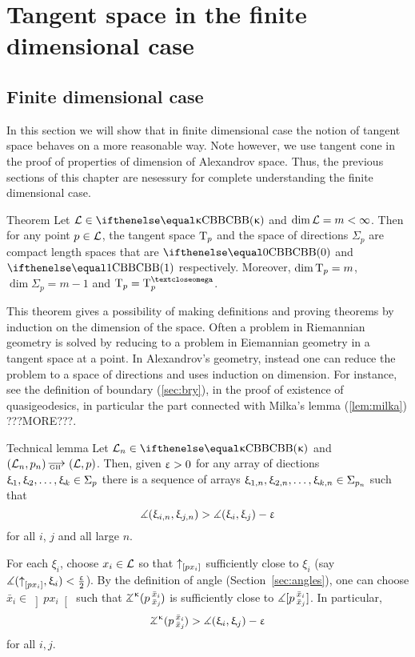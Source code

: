 
\chapter{Tangent space in the finite dimensional case}

\section{Finite dimensional case}

In this section we will show that in finite dimensional case the notion of tangent space behaves on a more reasonable way.
Note however, 
we use tangent cone in the proof of properties of dimension of Alexandrov space.
Thus, the previous sections of this chapter are nesessury for complete understanding the finite dimensional case.

\begin{thm}{Theorem}\label{thm:tan4finite} 
Let $\spc{L}\in \Alex\kappa$ and $\mathop{\rm dim}\nolimits\mathcal{L}=m<\infty$. 
Then for any point $p\in \spc{L}$, the tangent space $\text{\rm T}_p$ and the space of directions $\Sigma_p$ are compact length spaces that are  $\Alex 0$ and $\Alex1$ respectively.
Moreover, $\mathop{\rm dim}\nolimits\text{\rm T}_p=m$, $\dim\Sigma_p=m-1$ and  $\T_p=\T^\o_p$.
\end{thm}


This theorem gives a possibility of making definitions and proving theorems by induction on the dimension of the space.
Often a problem in Riemannian geometry is solved by 
reducing to a problem in Eiemannian geometry 
in a tangent space at a point.
In Alexandrov's geometry, instead one can reduce the problem 
to a space of directions and uses induction on dimension. 
For instance, see the  
definition of boundary (\ref{sec:bry}), 
in the proof of existence of quasigeodesics, in particular the part connected with Milka's lemma (\ref{lem:milka}) ???MORE???.

\begin{thm}{Technical lemma}\label{lem:tan-tech}
Let $\spc{L}_n\in \Alex\kappa$ and $(\spc{L}_n,p_n)\GHto(\spc{L},p)$.
Then, given $\upvarepsilon>0$ for any array of diections $\xi_1,\xi_2,\dots,\xi_\kay\in\Sigma_p$
there is a sequence of  arrays $\xi_{1,n},\xi_{2,n},\dots,\xi_{\kay,n}\in\Sigma_{p_n}$
such that \[\measuredangle(\upxi_{i,n},\upxi_{j,n})>\measuredangle(\upxi_i,\upxi_j)-\upvarepsilon\]
for all $i$, $j$ and all large $n$.
\end{thm}

For each $\xi_i$, choose $x_i\in \spc{L}$ so that ${\uparrow}_{[{p}{x_i}]}$ sufficiently close to $\xi_i$ 
(say $\measuredangle({\uparrow}_{[{p}{x_i}]},\upxi_i)<\tfrac{\upvarepsilon}2$).
By the definition of angle (Section~\ref{sec:angles}), 
one can choose $\bar x_i\in\left]px_i\right[$ such that
$\angk{\kappa}{p}{\bar x_i}{\bar x_j}$ is sufficiently close to $\measuredangle[p\,{}^{\bar x_i}_{\bar x_j}]$.
In particular,
\[\angk{\kappa}{p}{\bar x_i}{\bar x_j}>\mangle(\xi_i,\xi_j)-\eps\] 
for all $i,j$.


